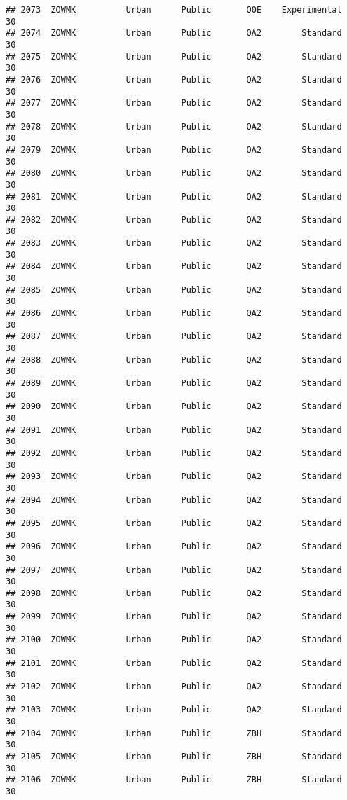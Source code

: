 \documentclass[
]{article}
\begin{document}
\begin{verbatim}
## 2073  ZOWMK          Urban      Public       Q0E    Experimental        30
## 2074  ZOWMK          Urban      Public       QA2        Standard        30
## 2075  ZOWMK          Urban      Public       QA2        Standard        30
## 2076  ZOWMK          Urban      Public       QA2        Standard        30
## 2077  ZOWMK          Urban      Public       QA2        Standard        30
## 2078  ZOWMK          Urban      Public       QA2        Standard        30
## 2079  ZOWMK          Urban      Public       QA2        Standard        30
## 2080  ZOWMK          Urban      Public       QA2        Standard        30
## 2081  ZOWMK          Urban      Public       QA2        Standard        30
## 2082  ZOWMK          Urban      Public       QA2        Standard        30
## 2083  ZOWMK          Urban      Public       QA2        Standard        30
## 2084  ZOWMK          Urban      Public       QA2        Standard        30
## 2085  ZOWMK          Urban      Public       QA2        Standard        30
## 2086  ZOWMK          Urban      Public       QA2        Standard        30
## 2087  ZOWMK          Urban      Public       QA2        Standard        30
## 2088  ZOWMK          Urban      Public       QA2        Standard        30
## 2089  ZOWMK          Urban      Public       QA2        Standard        30
## 2090  ZOWMK          Urban      Public       QA2        Standard        30
## 2091  ZOWMK          Urban      Public       QA2        Standard        30
## 2092  ZOWMK          Urban      Public       QA2        Standard        30
## 2093  ZOWMK          Urban      Public       QA2        Standard        30
## 2094  ZOWMK          Urban      Public       QA2        Standard        30
## 2095  ZOWMK          Urban      Public       QA2        Standard        30
## 2096  ZOWMK          Urban      Public       QA2        Standard        30
## 2097  ZOWMK          Urban      Public       QA2        Standard        30
## 2098  ZOWMK          Urban      Public       QA2        Standard        30
## 2099  ZOWMK          Urban      Public       QA2        Standard        30
## 2100  ZOWMK          Urban      Public       QA2        Standard        30
## 2101  ZOWMK          Urban      Public       QA2        Standard        30
## 2102  ZOWMK          Urban      Public       QA2        Standard        30
## 2103  ZOWMK          Urban      Public       QA2        Standard        30
## 2104  ZOWMK          Urban      Public       ZBH        Standard        30
## 2105  ZOWMK          Urban      Public       ZBH        Standard        30
## 2106  ZOWMK          Urban      Public       ZBH        Standard        30

\end{verbatim}
\end{document}
